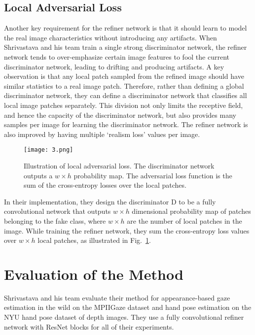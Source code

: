 \documentclass[10pt,twocolumn,letterpaper]{article}
\begin{document}
\subsection{Local Adversarial Loss}

Another key requirement for the refiner network is that it should learn to model the real image characteristics without introducing any artifacts. When Shrivastava and his team train a single strong discriminator network, the refiner network tends to over-emphasize certain image features to fool the current discriminator network, leading to drifting and producing artifacts. A key observation is that any local patch sampled from the refined image should have similar statistics to a real image patch. Therefore, rather than defining a global discriminator network, they can define a discriminator network that classifies all local image patches separately. This division not only limits the receptive field, and hence the capacity of the discriminator network, but also provides many samples per image for learning the discriminator network. The refiner network is also improved by having multiple `realism loss' values per image.
\begin{figure}
	\begin{center}
		\texttt{[image: 3.png]}
	\end{center}
	\caption{Illustration of local adversarial loss. The discriminator network outputs a $w\times h$ probability map. The adversarial loss function is the sum of the cross-entropy losses over the local patches.}
	\label{fig:3}
\end{figure}

In their implementation, they design the discriminator D to be a fully convolutional network that outputs $w\times h$ dimensional probability map of patches belonging to the fake class, where $w\times h$ are the number of local patches in the image. While training the refiner network, they sum the cross-entropy loss values over $w\times h$ local patches, as illustrated in Fig.~\ref{fig:3}.


\section{Evaluation of the Method}

Shrivastava and his team evaluate their method for appearance-based gaze estimation in the wild on the MPIIGaze dataset \cite{Wood} and hand pose estimation on the NYU hand pose dataset of depth images. They use a fully convolutional refiner network with ResNet blocks for all of their experiments.
\end{document}
